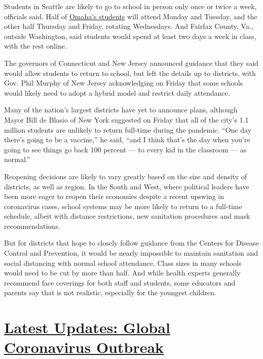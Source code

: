 Students in Seattle are likely to go to school in person only once or
twice a week, officials said. Half of
\href{https://www.omaha.com/news/ops-outlines-plan-for-fall-school-reopening-with-only-half-of-students-in-buldings-at/article_ca1b2f72-9cdd-5cfe-a77a-2a5d0821dfa6.html}{Omaha's
students} will attend Monday and Tuesday, and the other half Thursday
and Friday, rotating Wednesdays. And Fairfax County, Va., outside
Washington, said students would spend at least two days a week in class,
with the rest online.

The governors of Connecticut and New Jersey announced guidance that they
said would allow students to return to school, but left the details up
to districts, with Gov. Phil Murphy of New Jersey acknowledging on
Friday that some schools would likely need to adopt a hybrid model and
restrict daily attendance.

Many of the nation's largest districts have yet to announce plans,
although Mayor Bill de Blasio of New York suggested on Friday that all
of the city's 1.1 million students are unlikely to return full-time
during the pandemic. ``One day there's going to be a vaccine,'' he said,
``and I think that's the day when you're going to see things go back 100
percent --- to every kid in the classroom --- as normal.''

Reopening decisions are likely to vary greatly based on the size and
density of districts, as well as region. In the South and West, where
political leaders have been more eager to reopen their economies despite
a recent upswing in coronavirus cases, school systems may be more likely
to return to a full-time schedule, albeit with distance restrictions,
new sanitation procedures and mask recommendations.

But for districts that hope to closely follow guidance from the Centers
for Disease Control and Prevention, it would be nearly impossible to
maintain sanitation and social distancing with normal school attendance.
Class sizes in many schools would need to be cut by more than half. And
while health experts generally recommend face coverings for both staff
and students, some educators and parents say that is not realistic,
especially for the youngest children.

\hypertarget{latest-updates-global-coronavirus-outbreak}{%
\section{\texorpdfstring{\href{https://www.nytimes.com/2020/08/04/world/coronavirus-cases.html?action=click\&pgtype=Article\&state=default\&region=MAIN_CONTENT_1\&context=storylines_live_updates}{Latest
Updates: Global Coronavirus
Outbreak}}{Latest Updates: Global Coronavirus Outbreak}}\label{latest-updates-global-coronavirus-outbreak}}

